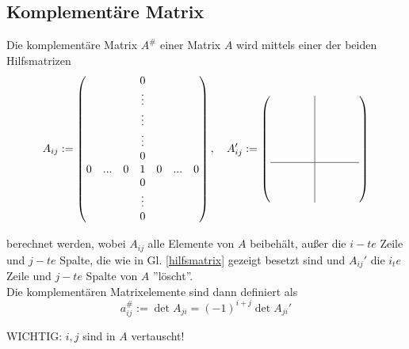 \documentclass{article}
\begin{document}
\newpage


\subsection{Komplementäre Matrix}
Die komplementäre Matrix $A^\#$ einer Matrix $A$ wird mittels einer der beiden Hilfsmatrizen
	\begin{equation}
	\label{hilfsmatrix}
		A_{ij} :=
		\begin{pmatrix}
			  & & & 0 & & & \\
			  & & & \vdots & & & \\
			  & & & \vdots & & & \\
			  & & & \vdots & & & \\
			  & & & 0 & & & \\
			0 & ... & 0 & 1 & 0 & ... & 0\\
			  & & & 0 & & & \\
			  & & & \vdots & & & \\
			  & & & 0 & & &
		\end{pmatrix}
		,\quad
		A_{ij}' :=
		\left(\begin{array}{cccc|cccc}
			  & & & & & & & \\
			  & & & & & & & \\
			  & & & & & & & \\
			  & & & & & & & \\
			  & & & & & & & \\
			\hline
			  & & & & & & & \\
			  & & & & & & & \\
			  & & & & & & &
		\end{array}\right)
	\end{equation}

berechnet werden, wobei $A_{ij}$ alle Elemente von $A$ beibehält, außer die $i-te$ Zeile und $j-te$ Spalte, die wie in Gl. \ref{hilfsmatrix} gezeigt besetzt sind und $A_{ij}'$ die $i_te$ Zeile und $j-te$ Spalte von $A$ ''löscht''.\\
Die komplementären Matrixelemente sind dann definiert als
	\begin{equation}
		\label{komplementäre matrix}
		a_{ij}^\# := \det A_{ji} = (-1)^{i+j}\det A_{ji}'
	\end{equation}

\textcolor{gruen}{WICHTIG: $i,j$ sind in $A$ vertauscht!}
\end{document}
